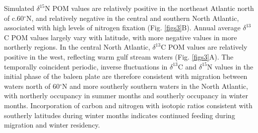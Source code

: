 \documentclass[a4paper,12pt]{article}
\begin{document}
Simulated $\delta^{15}$N POM values are relatively positive in the northeast Atlantic north of c.60$^{\circ}$N, and relatively negative in the central and southern North Atlantic, associated with high levels of nitrogen fixation (Fig. \ref{figs3}B). 
Annual average $\delta^{13}$C POM values largely vary with latitude, with more negative values in more northerly regions. 
In the central North Atlantic, $\delta^{13}$C POM values are relatively positive in the west, reflecting warm gulf stream waters (Fig. \ref{figs3}A). 
The temporally coincident periodic, inverse fluctuations in $\delta^{13}$C and $\delta^{15}$N values in the initial phase of the baleen plate are therefore consistent with migration between waters north of 60$^{\circ}$N and more southerly southern waters in the North Atlantic, with northerly occupancy in summer months and southerly occupancy in winter months. 
Incorporation of carbon and nitrogen with isotopic ratios consistent with southerly latitudes during winter months indicates continued feeding during migration and winter residency.
 
\end{document}
